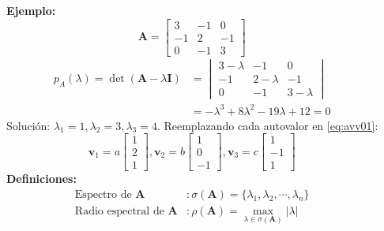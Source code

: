\documentclass[9pt, aspectratio=169]{beamer}
\begin{document}
\begin{frame}
\begin{columns}[t]
\cx
\textbf{Ejemplo:}
\[ \bm{A} = \begin{bmatrix}
    3 & -1 & 0 \\
    -1 & 2 & -1 \\
    0 & -1 & 3
\end{bmatrix} \]
\begin{align*}
   p_A(\lambda) =  \det(\bm{A} - \lambda \bm{I}) &= 
    \begin{vmatrix}
        3 - \lambda & -1 & 0 \\
        -1 & 2 - \lambda & -1 \\
        0 & -1 & 3 - \lambda
    \end{vmatrix} \\
   &= -\lambda^3 +8 \lambda^2 - 19 \lambda + 12 = 0
\end{align*}
Solución: $\lambda_1 = 1, \lambda_2 = 3, \lambda_3 = 4$. Reemplazando cada autovalor en \eqref{eq:avv01}:
\[ \bm{v}_1 = a \begin{bmatrix} 1 \\ 2 \\ 1 \end{bmatrix}, 
 \bm{v}_2 = b \begin{bmatrix} 1 \\ 0 \\ -1 \end{bmatrix}, 
 \bm{v}_3 = c \begin{bmatrix} 1 \\ -1 \\ 1 \end{bmatrix} \]
 \pause
\textbf{Definiciones:}
\begin{equation*}
    \begin{split}
        \text{Espectro de } \bm{A}&: \sigma(\bm{A}) = \{\lambda_1, \lambda_2, \cdots, \lambda_n \} \\
    \text{Radio espectral de } \bm{A}&: \rho(\bm{A}) = \max_{\lambda \in \sigma(\bm{A})}|\lambda|
    \end{split}
\end{equation*}
\end{columns}
\end{frame}
\end{document}
